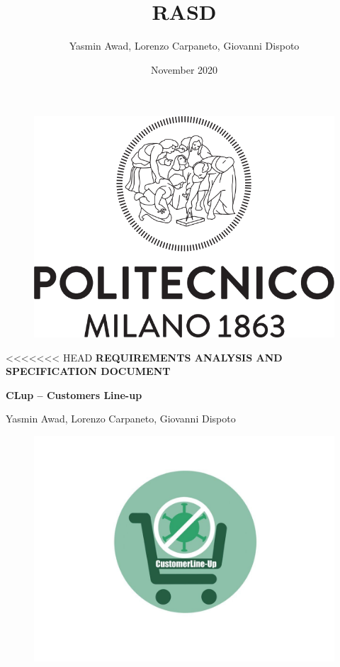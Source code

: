 \documentclass[a4paper, 12pt, oneside]{article}
\title{RASD}
\author{Yasmin Awad, Lorenzo Carpaneto, Giovanni Dispoto}
\date{November 2020}
\begin{document}
\begin{titlepage}
\begin{figure}[h!]
	\centering
	\includegraphics[scale=0.5]{img/logopoli.png}
\end{figure}
\vspace{0.7em}
\begin{center}
<<<<<<< HEAD
    \Large \textbf{REQUIREMENTS ANALYSIS AND SPECIFICATION DOCUMENT}
\end{center}
\begin{center}
    \Large \textbf{CLup – Customers Line-up } 
\end{center}
\vspace{-0.6em}
\begin{center}
    \normalsize Yasmin Awad, Lorenzo Carpaneto, Giovanni Dispoto
    \begin{figure}[h!]
    \centering
    \includegraphics[scale=0.25]{img/GUI/logo.jpg}

\end{figure}
\end{center}
\end{titlepage}
\end{document}
